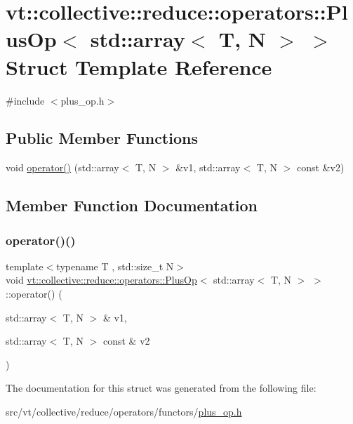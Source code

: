 \hypertarget{structvt_1_1collective_1_1reduce_1_1operators_1_1_plus_op_3_01std_1_1array_3_01_t_00_01_n_01_4_01_4}{}\section{vt\+:\+:collective\+:\+:reduce\+:\+:operators\+:\+:Plus\+Op$<$ std\+:\+:array$<$ T, N $>$ $>$ Struct Template Reference}
\label{structvt_1_1collective_1_1reduce_1_1operators_1_1_plus_op_3_01std_1_1array_3_01_t_00_01_n_01_4_01_4}


{\ttfamily \#include $<$plus\+\_\+op.\+h$>$}

\subsection*{Public Member Functions}
\begin{DoxyCompactItemize}
\item 
void \hyperlink{structvt_1_1collective_1_1reduce_1_1operators_1_1_plus_op_3_01std_1_1array_3_01_t_00_01_n_01_4_01_4_a5266a406392ed7d706cc9239505fa95f}{operator()} (std\+::array$<$ T, N $>$ \&v1, std\+::array$<$ T, N $>$ const \&v2)
\end{DoxyCompactItemize}


\subsection{Member Function Documentation}
\mbox{\label{structvt_1_1collective_1_1reduce_1_1operators_1_1_plus_op_3_01std_1_1array_3_01_t_00_01_n_01_4_01_4_a5266a406392ed7d706cc9239505fa95f}} 
\subsubsection{\texorpdfstring{operator()()}{operator()()}}
{\footnotesize\ttfamily template$<$typename T , std\+::size\+\_\+t N$>$ \\
void \hyperlink{structvt_1_1collective_1_1reduce_1_1operators_1_1_plus_op}{vt\+::collective\+::reduce\+::operators\+::\+Plus\+Op}$<$ std\+::array$<$ T, N $>$ $>$\+::operator() (\begin{DoxyParamCaption}\item[{std\+::array$<$ T, N $>$ \&}]{v1,  }\item[{std\+::array$<$ T, N $>$ const \&}]{v2 }\end{DoxyParamCaption})\hspace{0.3cm}{\ttfamily [inline]}}



The documentation for this struct was generated from the following file\+:\begin{DoxyCompactItemize}
\item 
src/vt/collective/reduce/operators/functors/\hyperlink{plus__op_8h}{plus\+\_\+op.\+h}\end{DoxyCompactItemize}

